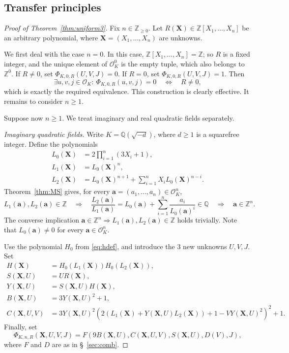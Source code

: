 \documentclass[12pt]{amsart}
\numberwithin{equation}{section}
\theoremstyle{remark}
\theoremstyle{plain}
\newcommand{\Z}{\mathbb{Z}}
\newcommand{\Q}{\mathbb{Q}}
\newcommand{\sO}{\mathcal{O}}
\newcommand{\bX}{\mathbf{X}}
\newcommand{\ba}{\mathbf{a}}
\begin{document}
\subsection{Transfer principles}
\begin{proof}[Proof of Theorem~\ref{thm:uniform3}]
Fix $n\in\Z_{\geq0}$. Let $R(\bX)\in\Z[X_1,\ldots,X_n]$ be an arbitrary polynomial, where $\bX=(X_1,\ldots,X_n)$ are unknowns.

We first deal with the case $n=0$. In this case, $\Z[X_1,\ldots,X_n]=\Z$; so $R$ is a fixed integer, and the unique element of $\sO_K^0$ is the empty tuple, which also belongs to $\Z^0$. If $R\neq0$, set $\Phi_{K,0,R}(U,V,J)=0$. If $R=0$, set $\Phi_{K,0,R}(U,V,J)=1$. Then
\[
\exists u,v,j\in\sO_K\colon\ \Phi_{K,0,R}(u,v,j)=0\quad\Longleftrightarrow\quad R\neq0,
\]
which is exactly the required equivalence. This construction is clearly effective. It remains to consider $n\geq1$.

\smallskip

Suppose now $n\geq1$. We treat imaginary and real quadratic fields separately. 

\smallskip

\noindent\emph{Imaginary quadratic fields.}
Write $K=\Q(\sqrt{-d})$, where $d\geq1$ is a squarefree integer. Define the polynomials
\begin{align*}
L_0(\bX)&=2\prod_{i=1}^n(3X_i+1),\\
L_1(\bX)&=L_0(\bX)^n,\\
L_2(\bX)&=L_0(\bX)^{n+1}+\sum_{i=1}^nX_iL_0(\bX)^{n-i}.
\end{align*}
Theorem~\ref{thm:MS} gives, for every $\ba=(a_1,\ldots,a_n)\in\sO_K^n$,
\begin{equation}\label{eq:uniform-imag-MS}
L_1(\ba),L_2(\ba)\in\Z\quad\Longrightarrow\quad\frac{L_2(\ba)}{L_1(\ba)}=L_0(\ba)+\sum_{i=1}^n\frac{a_i}{L_0(\ba)^i}\in\Q\quad\Longrightarrow\quad\ba\in\Z^n.
\end{equation}
The converse implication $\ba\in\Z^n\Rightarrow L_1(\ba),L_2(\ba)\in\Z$ holds trivially. Note that $L_0(\ba)\neq0$ for every $\ba\in\sO_K^n$.

Use the polynomial $H_0$ from \eqref{eq:hdef}, and introduce the $3$ new
unknowns $U,V,J$. Set
\begin{align*}
H(\bX)&=H_0(L_1(\bX))H_0(L_2(\bX)),\\
S(\bX,U)&=U R(\bX),\\
Y(\bX,U)&=S(\bX,U)H(\bX),\\
B(\bX,U)&=3Y(\bX,U)^2+1,\\
C(\bX,U,V)&=3Y(\bX,U)^2\left(2\left(L_1(\bX)+Y(\bX,U)L_2(\bX)\right)+1-VY(\bX,U)^2\right)^2+1.
\end{align*}
Finally, set
\[
\Phi_{K,n,R}(\bX,U,V,J)=F\left(9B(\bX,U),C(\bX,U,V),S(\bX,U),D(V),J\right),
\]
where $F$ and $D$ are as in \S~\ref{sec:comb}.


\end{proof}
\end{document}
